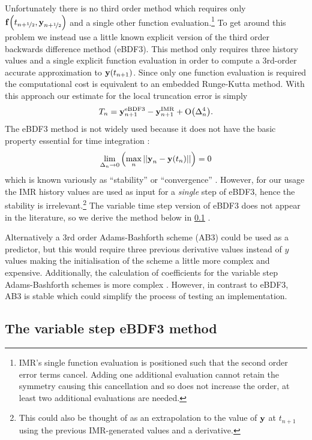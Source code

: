 Unfortunately there is no third order method which requires only ${\boldsymbol{\mathrm{f}}{\left( t_{n+\nicefrac{1}{2}}, \boldsymbol{\mathrm{y}}_{n+\nicefrac{1}{2}} \right)}}$ and a single other function evaluation.\footnote{IMR's single function evaluation is positioned such that the second order error terms cancel. Adding one additional evaluation cannot retain the symmetry causing this cancellation and so does not increase the order, at least two additional evaluations are needed.}
To get around this problem we instead use a little known explicit version of the third order backwards difference method (eBDF3).
This method only requires three history values and a single explicit function evaluation in order to compute a 3rd-order accurate approximation to $\boldsymbol{\mathrm{y}}(t_{n+1})$.
Since only one function evaluation is required the computational cost is equivalent to an embedded Runge-Kutta method.
With this approach our estimate for the local truncation error is simply
\begin{equation}
  \label{eq:aimr-lte-est}
  T_n = \boldsymbol{\mathrm{y}}_{n+1}^{\mathrm{eBDF3}} - \boldsymbol{\mathrm{y}}_{n+1}^{\mathrm{IMR}} + \mathrm{O}{\left( \Delta_{n}^4 \right)}.
\end{equation}
The eBDF3 method is not widely used because it does not have the basic property essential for time integration \cite[365]{HairerNorsettWanner}:
\begin{equation}
  \lim_{\Delta_{n} \rightarrow 0} {\left(  \max_n \left| \left| \boldsymbol{\mathrm{y}}_{n} - \boldsymbol{\mathrm{y}}(t_n) \right| \right| \right)} = 0
\end{equation}
which is known variously as ``stability'' \cite[378]{HairerNorsettWanner} or ``convergence'' \cite[6]{Iserles2009}.
However, for our usage the IMR history values are used as input for a \emph{single} step of eBDF3, hence the stability is irrelevant.\footnote{This could also be thought of as an extrapolation to the value of $\boldsymbol{\mathrm{y}}$ at $t_{n+1}$ using the previous IMR-generated values and a derivative.}
The variable time step version of eBDF3 does not appear in the literature, so we derive the method below in \cref{sec:variable-step-ebdf3} .

Alternatively a 3rd order Adams-Bashforth scheme (AB3) could be used as a predictor, but this would require three previous derivative values instead of $y$ values making the initialisation of the scheme a little more complex and expensive.
Additionally, the calculation of coefficients for the variable step Adams-Bashforth schemes is more complex \cite[400]{HairerNorsettWanner}.
However, in contrast to eBDF3, AB3 is stable which could simplify the process of testing an implementation.


\subsection{The variable step eBDF3 method}
\label{sec:variable-step-ebdf3}

